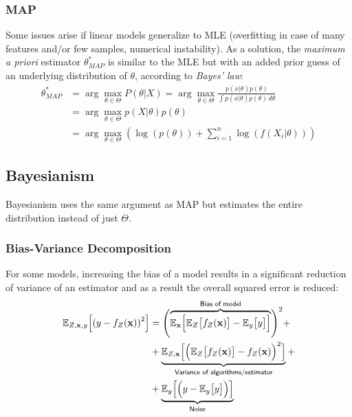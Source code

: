 \subsubsection{MAP}
Some issues arise if linear models generalize to MLE (overfitting in case of many features and/or few samples, numerical instability).
As a solution, the \textit{maximum a priori} estimator $\theta^*_{MAP}$ is similar to the MLE but with an added prior guess of an underlying distribution of $\theta$, according to \textit{Bayes' law}:
\noindent\begin{align*}
    \theta^*_{MAP} & = \arg\max_{\theta\in\Theta} P(\theta|X)  = \arg\max_{\theta\in\Theta} \frac{p(x|\theta)p(\theta)}{\int p(x|\theta)p(\theta)\, d\theta} \\
                   & = \arg\max_{\theta\in\Theta} p(X|\theta)p(\theta)                                                                                       \\
                   & = \arg\max_{\theta\in\Theta}\left(\log(p(\theta)) + \sum_{i=1}^{n}\log(f(X_i|\theta))\right)
\end{align*}

\subsection{Bayesianism}
Bayesianism uses the same argument as MAP but estimates the entire distribution instead of just $\Theta$.

\subsubsection{Bias-Variance Decomposition}
For some models, increasing the bias of a model results in a significant reduction of variance of an estimator and as a result the overall squared error is reduced:
\noindent\begin{align*}
    \mathbb{E}_{Z,\mathbf{x},y}\Bigl[{(y-f_Z(\mathbf{x}))}^2\Bigr] & = \Biggl(\overbrace{\mathbb{E}_{\mathbf{x}}\Bigl[\mathbb{E}_{Z}\bigl[f_Z(\mathbf{x})\bigr]-\mathbb{E}_{y}\bigl[y\bigr]\Bigr]}^{\textsf{Bias of model}}\Biggr)^2 + \\%
                                                                   & +\underbrace{\mathbb{E}_{Z,\mathbf{x}}\Bigl[{\Bigl(\mathbb{E}_{Z}\bigl[f_Z(\mathbf{x})\bigr]-f_Z(\mathbf{x})\Bigr)}^2\Bigr]}_{\textsf{Variance of algorithms/estimator}}+    \\
                                                                   & +\underbrace{\mathbb{E}_{y}\Bigl[{\Bigl(y-\mathbb{E}_{y}\bigl[y\bigr]\Bigr)}\Bigr]}_{\textsf{Noise}}
\end{align*}

